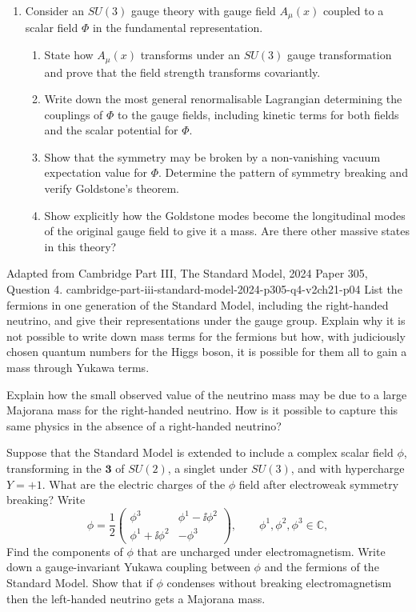 \begin{enumerate}
\begin{enumerate}
    \item[(b)]
    Consider an \(SU(3)\) gauge theory with gauge field \(A_\mu(x)\)
    coupled to a scalar field \(\Phi\) in the fundamental representation.
    \begin{enumerate}
      \item[(i)]
      State how \(A_\mu(x)\) transforms under an \(SU(3)\) gauge
      transformation and prove that the field strength transforms
      covariantly.
      \item[(ii)]
      Write down the most general renormalisable Lagrangian determining
      the couplings of \(\Phi\) to the gauge fields, including kinetic
      terms for both fields and the scalar potential for \(\Phi\).
      \item[(iii)]
      Show that the symmetry may be broken by a non-vanishing vacuum
      expectation value for \(\Phi\).  Determine the pattern of symmetry
      breaking and verify Goldstone's theorem.
      \item[(iv)]
      Show explicitly how the Goldstone modes become the longitudinal
      modes of the original gauge field to give it a mass.  Are there
      other massive states in this theory?
    \end{enumerate}
  \end{enumerate}

  {Adapted from Cambridge Part III, The Standard Model, 2024 Paper 305,
  Question 4.}
  {cambridge-part-iii-standard-model-2024-p305-q4-v2ch21-p04}
  List the fermions in one generation of the Standard Model, including
  the right-handed neutrino, and give their representations under the
  gauge group.  Explain why it is not possible to write down mass terms
  for the fermions but how, with judiciously chosen quantum numbers for
  the Higgs boson, it is possible for them all to gain a mass through
  Yukawa terms.

  Explain how the small observed value of the neutrino mass may be due to
  a large Majorana mass for the right-handed neutrino.  How is it possible
  to capture this same physics in the absence of a right-handed neutrino?

  Suppose that the Standard Model is extended to include a complex scalar
  field \(\phi\), transforming in the \(\mathbf3\) of \(SU(2)\), a
  singlet under \(SU(3)\), and with hypercharge \(Y=+1\).  What are the
  electric charges of the \(\phi\) field after electroweak symmetry
  breaking?  Write
  \[
    \phi=\frac12
    \begin{pmatrix}
      \phi^3 & \phi^1-\ii\phi^2\\
      \phi^1+\ii\phi^2 & -\phi^3
    \end{pmatrix},
    \qquad \phi^1,\phi^2,\phi^3\in\mathbb C,
  \]
  Find the components of \(\phi\) that are uncharged under
  electromagnetism.  Write down a gauge-invariant Yukawa coupling between
  \(\phi\) and the fermions of the Standard Model.  Show that if \(\phi\)
  condenses without breaking electromagnetism then the left-handed
  neutrino gets a Majorana mass.


\end{enumerate}
